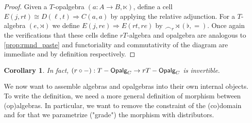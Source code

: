 \documentclass[10pt,a4paper]{article}
\newcommand{\cat}[1]{\textcat{#1}}
\newcommand{\textcat}[1]{{\normalfont\textsf{#1}}}
\newcommand{\To}{\Rightarrow}
\newcommand{\simeqq}{\cong}
\DeclareMathOperator{\Opalg}{\cat{Opalg}}
\theoremstyle{plain}
\newtheorem{corollary}[theorem]{Corollary}
\theoremstyle{definition}
\theoremstyle{remark}
\begin{document}
\begin{proof}
    Given a $T$-opalgebra $(a : A \to B, \ltimes)$, define a cell $E(j, rt) \simeqq D(\ell, t) \To C(a, a)$ by applying the relative adjunction. For a $T$-algebra $(e, \rtimes)$ we define $E(j, re) \To E(rt, re)$ by $\smallfrown_r\rtimes(\flat, =)$. Once again the verifications that these cells define $rT$-algebra and opalgebra are analogous to \ref{prop:rmnd_paste} and functoriality and commutativity of the diagram are immediate and by definition respectively.
\end{proof}

\begin{corollary}
    In fact, $(r\circ-) : T-\Opalg_C \to rT-\Opalg_C$ is invertible.
\end{corollary}

We now want to assemble algebras and opalgebras into their own internal objects. To write the definition, we need a more general definition of morphism between (op)algebras. In particular, we want to remove the constraint of the (co)domain and for that we parametrize ("grade") the morphism with distributors.
\end{document}
